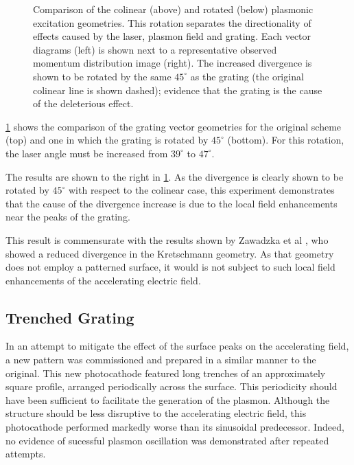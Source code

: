 \begin{figure}
  \centering
  
  \caption{
    Comparison of the colinear (above) and rotated (below) plasmonic excitation geometries.
    This rotation separates the directionality of effects caused by the laser, plasmon field and grating.
    Each vector diagrams (left) is shown next to a representative observed momentum distribution image (right).
    The increased divergence is shown to be rotated by the same $45^{\circ}$ as the grating (the original colinear line is shown dashed); evidence that the grating is the cause of the deleterious effect.
  }
  \label{fig:rotated}
\end{figure}

\ref{fig:rotated} shows the comparison of the grating vector geometries for the original scheme (top) and one in which the grating is rotated by $45^{\circ}$ (bottom).
For this rotation, the laser angle must be increased from $39^{\circ}$ to $47^{\circ}$.

The results are shown to the right in \ref{fig:rotated}.
As the divergence is clearly shown to be rotated by $45^{\circ}$ with respect to the colinear case, this experiment demonstrates that the cause of the divergence increase is due to the local field enhancements near the peaks of the grating.

This result is commensurate with the results shown by Zawadzka et al \cite{zawadzka_evanescent_2001}, who showed a reduced divergence in the Kretschmann geometry.
As that geometry does not employ a patterned surface, it would is not subject to such local field enhancements of the accelerating electric field.

\subsection{Trenched Grating}

In an attempt to mitigate the effect of the surface peaks on the accelerating field, a new pattern was commissioned and prepared in a similar manner to the original.
This new photocathode featured long trenches of an approximately square profile, arranged periodically across the surface.
This periodicity should have been sufficient to facilitate the generation of the plasmon.
Although the structure should be less disruptive to the accelerating electric field, this photocathode performed markedly worse than its sinusoidal predecessor.
Indeed, no evidence of sucessful plasmon oscillation was demonstrated after repeated attempts.

